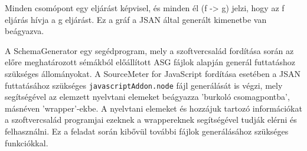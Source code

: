 Minden csomópont egy eljárást képvisel, és minden él (f -> g) jelzi, hogy az f eljárás hívja a g eljárást. Ez a gráf a JSAN által generált kimenetbe van beágyazva.

A SchemaGenerator egy segédprogram, mely a szoftvercsalád fordítása során az előre meghatározott sémákból előállított ASG fájlok alapján generál futtatáshoz szükséges állományokat. A SourceMeter for JavaScript fordítása esetében a JSAN futtatásához szükséges \texttt{javascriptAddon.node} fájl generálását is végzi, mely segítségével az elemzett nyelvtani elemeket beágyazza 'burkoló csomagpontba', másnéven 'wrapper'-ekbe. A nyelvtani elemeket és hozzájuk tartozó információkat a szoftvercsalád programjai ezeknek a wrappereknek segítségével tudják elérni és felhasználni. Ez a feladat során kibővül további fájlok generálásához szükséges funkciókkal.

